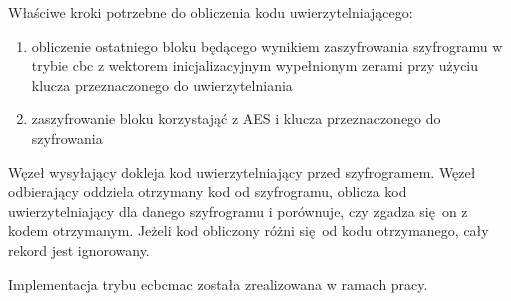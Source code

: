 Właściwe kroki potrzebne do obliczenia kodu uwierzytelniającego:

\begin{enumerate}
\item obliczenie ostatniego bloku będącego wynikiem zaszyfrowania szyfrogramu w trybie \gls{cbc} z wektorem inicjalizacyjnym wypełnionym zerami przy użyciu klucza przeznaczonego do uwierzytelniania
\item zaszyfrowanie bloku korzystająć z AES i klucza przeznaczonego do szyfrowania
\end{enumerate}

Węzeł wysyłający dokleja kod uwierzytelniający przed szyfrogramem. Węzeł odbierający oddziela otrzymany kod od szyfrogramu, oblicza kod uwierzytelniający dla danego szyfrogramu i porównuje, czy zgadza się on z kodem otrzymanym. Jeżeli kod obliczony różni się od kodu otrzymanego, cały rekord jest ignorowany.

Implementacja trybu \gls{ecbcmac} została zrealizowana w ramach pracy.
